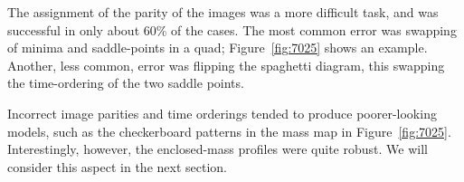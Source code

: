 \documentclass[usenatbib]{mn2e}
\newcommand{\figref}[1]{Figure~\ref{fig:#1}}
\begin{document}
The assignment of the parity of the images was a more difficult task,
and was successful in only about 60\% of the cases.  The most common
error was swapping of minima and saddle-points in a quad;
\figref{7025} shows an example.  Another, less common, error was
flipping the spaghetti diagram, this swapping the time-ordering of the
two saddle points.

Incorrect image parities and time orderings tended to produce
poorer-looking models, such as the checkerboard patterns in the mass
map in \figref{7025}.  Interestingly, however, the enclosed-mass
profiles were quite robust.  We will consider this aspect in the next
section.

\FloatBarrier

\begin{figure}
  \centering
\end{figure}
\end{document}
